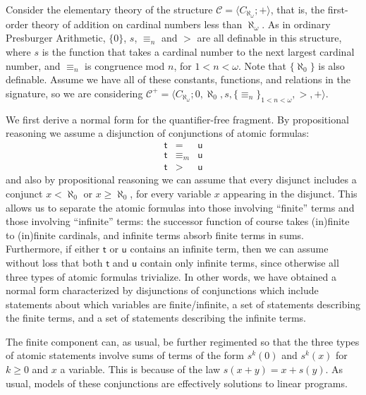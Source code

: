 \documentclass[12pt,oneside,reqno]{amsart}
\theoremstyle{definition}
\begin{document}
Consider the elementary theory of the structure $\mathcal{C} = \langle C_{\aleph_\omega};+\rangle$, that is, the first-order theory of addition on cardinal numbers less than $\aleph_\omega$. As in ordinary Presburger Arithmetic, $\{0\}$, $s$, $\equiv_n$ and $>$ are all definable in this structure, where $s$ is the function that takes a cardinal number to the next largest cardinal number, %
and $\equiv_n$ is congruence mod $n$, for $1<n<\omega$. Note that $\{\aleph_0\}$ is also definable. Assume we have all of these constants, functions, and relations in the signature, so we are considering  $\mathcal{C}^+ = \langle C_{\aleph_\omega};0,\aleph_0,s,\{\equiv_n\}_{1<n<\omega},>,+\rangle$. 


We first derive a normal form for the quantifier-free fragment. By propositional reasoning we assume a disjunction of conjunctions of atomic formulas: \begin{eqnarray*}
\mathsf{t} & = & \mathsf{u} \\
\mathsf{t} & \equiv_m & \mathsf{u} \\
\mathsf{t} & > & \mathsf{u} 
\end{eqnarray*} and also by propositional reasoning we can assume that every disjunct includes a conjunct $x < \aleph_0$ or $x \geq \aleph_0$, for every variable $x$ appearing in the disjunct. This allows us to separate the atomic formulas into those involving ``finite'' terms and those involving ``infinite'' terms: the successor function of course takes (in)finite to (in)finite cardinals, and infinite terms absorb finite terms in sums. Furthermore, if either $\mathsf{t}$ or $\mathsf{u}$ contains an infinite term, then we can assume without loss that both $\mathsf{t}$ and $\mathsf{u}$ contain only infinite terms, since otherwise all three types of atomic formulas trivialize. In other words, we have obtained a normal form characterized by disjunctions of conjunctions which include statements about which variables are finite/infinite, a set of statements describing the finite terms, and a set of statements describing the infinite terms.

The finite component can, as usual, be further regimented so that the three types of atomic statements involve sums of terms of the form $s^k(0)$ and $s^k(x)$ for $k\geq0$ and $x$ a variable. This is because of the law $s(x+y)=x+s(y)$. As usual, models of these  conjunctions are effectively solutions to linear programs. 
\end{document}
